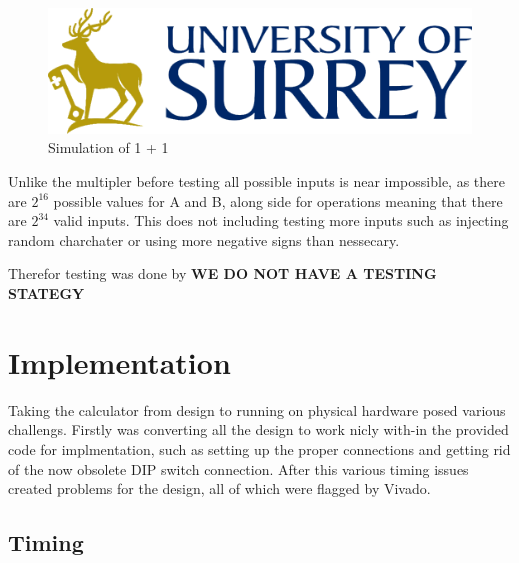 \documentclass[11pt]{article}
\begin{document}
\begin{figure}[H]        
    \centering
    \includegraphics[width=\textwidth]{Logo.png}
    \caption{Simulation of 1 + 1}
    \label{fig:sim}
\end{figure} 

Unlike the multipler before testing all possible inputs is near impossible, as there are $2^{16}$ possible values for A and B, along side for operations meaning that there are $2^{34}$ valid inputs.
This does not including testing more inputs such as injecting random charchater or using more negative signs than nessecary.

Therefor testing was done by \textbf{WE DO NOT HAVE A TESTING STATEGY}


\section{Implementation}

Taking the calculator from design to running on physical hardware posed various challengs.
Firstly was converting all the design to work nicly with-in the provided code for implmentation, such as setting up the proper connections and getting rid of the now obsolete DIP switch connection.
After this various timing issues created problems for the design, all of which were flagged by Vivado. 

\subsection{Timing}

\pagebreak
\printbibliography
\end{document}
